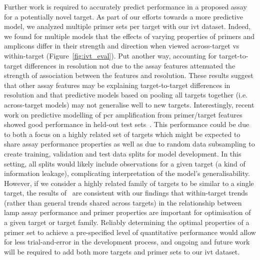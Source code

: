 \documentclass[../thesis.tex]{subfiles}
\begin{document}
Further work is required to accurately predict performance in a proposed assay for a potentially novel target. As part of our efforts towards a more predictive model, we analyzed multiple primer sets per target with our \gls{ivt}  dataset. Indeed, we found for multiple models that the effects of varying properties of primers and amplicons differ in their strength and direction when viewed across-target vs within-target (Figure~\ref{fig:ivt_eval}). Put another way, accounting for target-to-target differences in resolution not due to the assay features attenuated the strength of association between the features and resolution. These results suggest that other assay features may be explaining target-to-target differences in resolution and that predictive models based on pooling all targets together (i.e. across-target models) may not generalise well to new targets. Interestingly, recent work on predictive modelling of \gls{pcr} amplification from primer/target features showed good performance in held-out test sets~\citep{doring_modeling_2019}. This performance could be due to both a focus on a highly related set of targets which might be expected to share assay performance properties as well as due to random data subsampling to create training, validation and test data splits for model development. In this setting, all splits would likely include observations for a given target (a kind of information leakage), complicating interpretation of the model's generalisability. However, if we consider a highly related family of targets to be similar to a single target, the results of~\citet{doring_modeling_2019} are consistent with our findings that within-target trends (rather than general trends shared across targets) in the relationship between \gls{lamp} assay performance and primer properties are important for optimisation of a given target or target family. Reliably determining the optimal properties of a primer set to achieve a pre-specified level of quantitative performance would allow for less trial-and-error in the development process, and ongoing and future work will be required to add both more targets and primer sets to our \gls{ivt}  dataset.
\end{document}
